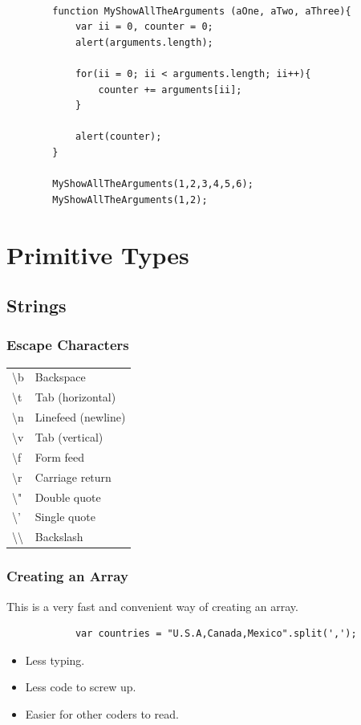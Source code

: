 \documentclass {amsart}
\begin{document}
	\begin{lstlisting}

		function MyShowAllTheArguments (aOne, aTwo, aThree){
			var ii = 0, counter = 0;		
			alert(arguments.length);

			for(ii = 0; ii < arguments.length; ii++){
				counter += arguments[ii];
			}

			alert(counter);
		}

		MyShowAllTheArguments(1,2,3,4,5,6);
		MyShowAllTheArguments(1,2);

	\end{lstlisting}


\section{Primitive Types}
	\subsection{Strings}
			\subsubsection{Escape Characters}

			\begin{center}
			\begin{tabular} {| l |p{5cm}|}
			
				\textbackslash{b} & Backspace \\
				\textbackslash{t} & Tab (horizontal) \\
				\textbackslash{n} & Linefeed (newline) \\
				\textbackslash{v} & Tab (vertical) \\
				\textbackslash{f} & Form feed  \\
				\textbackslash{r} & Carriage return        \\
				\textbackslash{"} & Double quote           \\
				\textbackslash{'} & Single quote           \\
				\textbackslash{}\textbackslash{} & Backslash              \\

			\end{tabular}
			\end{center}
	\subsubsection{Creating an Array}  This is a very fast and convenient way of creating an array.  
		\begin{lstlisting}
			var countries = "U.S.A,Canada,Mexico".split(',');
		\end{lstlisting}
		\begin{itemize}
			\item Less typing.
			\item Less code to screw up.
			\item Easier for other coders to read.
		\end{itemize}
\end{document}
